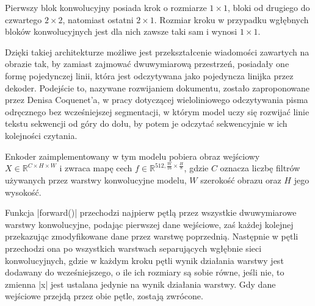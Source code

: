 Pierwszy blok konwolucyjny posiada krok o rozmiarze $1 \times 1$, bloki od drugiego do czwartego $2\times 2$, natomiast ostatni $2 \times 1$. Rozmiar kroku w przypadku wgłębnych bloków konwolucyjnych jest dla nich zawsze taki sam i wynosi $1 \times 1$.

Dzięki takiej architekturze możliwe jest przekształcenie wiadomości zawartych na obrazie tak, by zamiast zajmować dwuwymiarową przestrzeń, posiadały one formę pojedynczej linii, która jest odczytywana jako pojedyncza linijka przez dekoder. Podejście to, nazywane rozwijaniem dokumentu, zostało zaproponowane przez Denisa Coquenet'a, w pracy dotyczącej wieloliniowego odczytywania pisma odręcznego bez wcześniejszej segmentacji\cite{Coquenet2021}, w którym model uczy się rozwijać linie tekstu sekwencji od góry do dołu, by potem je odczytać sekwencyjnie w ich kolejności czytania. 

Enkoder zaimplementowany w tym modelu pobiera obraz wejściowy $X \in \mathbb{R}^{C\times H \times W}$ i zwraca mapę cech $f \in \mathbb{R}^{512, \frac{W}{16}\times\frac{H}{8}}$, gdzie $C$ oznacza liczbę filtrów używanych przez warstwy konwolucyjne modelu, $W$ szerokość obrazu oraz $H$ jego wysokość.

Funkcja \pyth|forward()| przechodzi najpierw pętlą przez wszystkie dwuwymiarowe warstwy konwolucyjne, podając pierwszej dane wejściowe, zaś każdej kolejnej przekazując zmodyfikowane dane przez warstwę poprzednią. Następnie w pętli przechodzi ona po wszystkich warstwach separujących wgłębnie sieci konwolucyjnych, gdzie w każdym kroku pętli wynik działania warstwy jest dodawany do wcześniejszego, o ile ich rozmiary są sobie równe, jeśli nie, to zmienna \pyth|x| jest ustalana jedynie na wynik działania warstwy. Gdy dane wejściowe przejdą przez obie pętle, zostają zwrócone.



